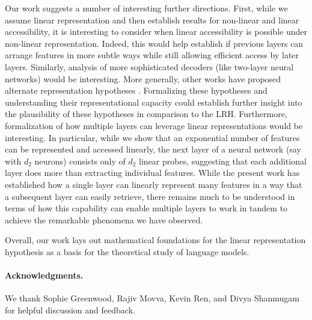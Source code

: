 \documentclass[11pt]{article}
\begin{document}
Our work suggests a number of interesting further directions. First, while we assume linear representation and then establish results for non-linear and linear accessibility, it is interesting to consider when linear accessibility is possible under non-linear representation. Indeed, this would help establish if previous layers can arrange features in more subtle ways while still allowing efficient access by later layers. Similarly, analysis of more sophisticated decoders (like two-layer neural networks) would be interesting. More generally, other works have proposed alternate representation hypotheses \citep{engels2024not, csordas2024recurrent, kantamneni2025language}. Formalizing these hypotheses and understanding their representational capacity could establish further insight into the plausibility of these hypotheses in comparison to the LRH. Furthermore, formalization of how multiple layers can leverage linear representations would be interesting. In particular, while we show that an exponential number of features can be represented and accessed linearly, the next layer of a neural network (say with $d_2$ neurons) consists only of $d_2$ linear probes, suggesting that each additional layer does more than extracting individual features. While the present work has established how a single layer can linearly represent many features in a way that a subsequent layer can easily retrieve, there remains much to be understood in terms of how this capability can enable multiple layers to work in tandem to achieve the remarkable phenomena we have observed.

Overall, our work lays out mathematical foundations for the linear representation hypothesis as a basis for the theoretical study of language models.

\paragraph{Acknowledgments.} We thank Sophie Greenwood, Rajiv Movva, Kevin Ren, and Divya Shanmugam for helpful discussion and feedback.


{


}
\end{document}
